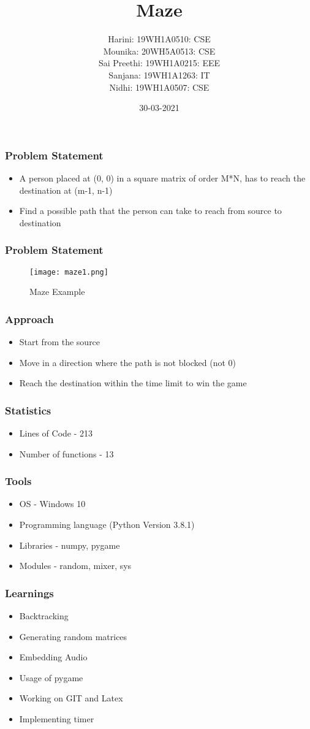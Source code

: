 \documentclass[14pt]{beamer}
\title{Maze}
\date{30-03-2021}
\author[Bvrith]{Harini: 19WH1A0510: CSE \\ Mounika: 20WH5A0513: CSE \\ Sai Preethi: 19WH1A0215: EEE  \\ Sanjana: 19WH1A1263: IT \\  Nidhi: 19WH1A0507: CSE }
\institute{\normalsize{\color{blendedblue}{BVRIT HYDERABAD College of Engineering for Women}}}
\begin{document}
    \begin{frame}
        \titlepage
    \end{frame}
    \begin{frame}
	\frametitle{Problem Statement}
        \begin{itemize}
	    \item A person placed at (0, 0) in a square matrix of order M*N, has to reach the destination at (m-1, n-1)
	    \item Find a possible path that the person can take to reach from source to destination
	\end{itemize}
    \end{frame}
    \begin{frame}
	    \frametitle{Problem Statement}
	    \begin{figure}[htp]
                        \centering
                         \texttt{[image: maze1.png]}
			 \caption{Maze Example}
                 \end{figure}
    \end{frame}
    \begin{frame}
	\frametitle{Approach}
	\begin{itemize}
		\item Start from the source 
		\item Move in a direction where the path is not blocked (not 0)
		\item Reach the destination within the time limit to win the game
	\end{itemize}
    \end{frame}
    \begin{frame}
	\frametitle{Statistics}
	\begin{itemize}
		\item Lines of Code - 213
		\item Number of functions - 13
	\end{itemize}
    \end{frame}
    \begin{frame}
	\frametitle{Tools}
	\begin{itemize}
		\item OS - Windows 10
		\item Programming language (Python Version 3.8.1)
		\item Libraries - numpy, pygame
		\item Modules - random, mixer, sys
	\end{itemize}
    \end{frame}
    \begin{frame}
        \frametitle{Learnings}
	\begin{itemize}
	    \item Backtracking 
	    \item Generating random matrices
	    \item Embedding Audio 
	    \item Usage of pygame
	    \item Working on GIT and Latex
	    \item Implementing timer
	\end{itemize}
    \end{frame}
\end{document}
